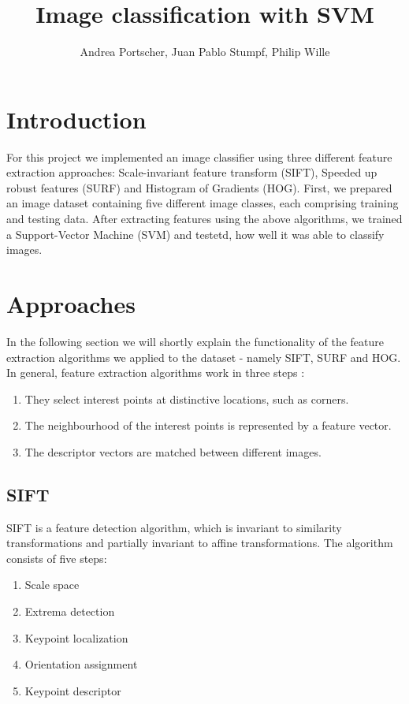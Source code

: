 \documentclass{scrartcl}
\title{Image classification with SVM}
\author{Andrea Portscher, Juan Pablo Stumpf, Philip Wille}
\begin{document}
\maketitle

\section{Introduction}
For this project we implemented an image classifier using three different feature extraction approaches: Scale-invariant feature transform (SIFT), Speeded up robust features (SURF) and Histogram of Gradients (HOG). First, we prepared an image dataset containing five different image classes, each comprising training and testing data. After extracting features using the above algorithms, we trained a Support-Vector Machine (SVM) and testetd, how well it was able to classify images.
\section{Approaches}
In the following section we will shortly explain the functionality of the feature extraction algorithms we applied to the dataset - namely SIFT, SURF and HOG.
In general, feature extraction algorithms work in three steps \cite{bay2006}:
\begin{enumerate}
  \item They select interest points at distinctive locations, such as corners.
  \item The neighbourhood of the interest points is represented by a feature vector.
  \item The descriptor vectors are matched between different images.
\end{enumerate}

\subsection{SIFT}
SIFT is a feature detection algorithm, which is invariant to similarity transformations and partially invariant to affine transformations. The algorithm consists of five steps:

\begin{enumerate}
    \item Scale space
    \item Extrema detection
    \item Keypoint localization
    \item Orientation assignment
    \item Keypoint descriptor
\end{enumerate}
\end{document}
